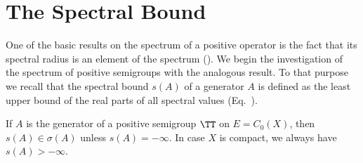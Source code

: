 \section{The Spectral Bound}\label{sec:b3-1}%
One of the basic results on the spectrum of a positive operator is the fact that its spectral radius is an element of the spectrum (\textcite[V.Proposition~4.1]{schaefer:1974}).
We begin the investigation of the spectrum of positive semigroups with the analogous result.
To that purpose we recall that the spectral bound $s(A)$ of a generator $A$ is defined as the least upper bound of the real parts of all spectral values (\cf Eq.~).
%
\begin{theorem}\label{thm:b3-1.1}%
If\/ $A$ is the generator of a positive semigroup $\TT$ on $E = C_{0}(X)$, then $s(A) \in \sigma(A)$ unless 
$s(A) = -\infty$.
In case $X$ is compact, we always have $s(A) > -\infty$.
\end{theorem}
\vfill
